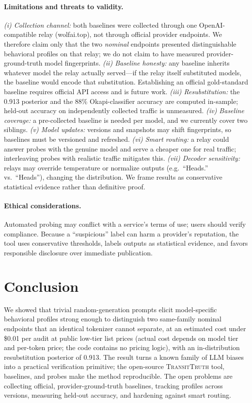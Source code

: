 \documentclass[10pt,twocolumn,letterpaper]{article}
\begin{document}
\paragraph{Limitations and threats to validity.}
\emph{(i) Collection channel:} both baselines were collected through one OpenAI-compatible relay (wolfai.top), not through official provider endpoints. We therefore claim only that the two \emph{nominal} endpoints presented distinguishable behavioral profiles on that relay; we do not claim to have measured provider-ground-truth model fingerprints. \emph{(ii) Baseline honesty:} any baseline inherits whatever model the relay actually served---if the relay itself substituted models, the baseline would encode that substitution. Establishing an official gold-standard baseline requires official API access and is future work. \emph{(iii) Resubstitution:} the 0.913 posterior and the 88\% Okapi-classifier accuracy are computed in-sample; held-out accuracy on independently collected traffic is unmeasured. \emph{(iv) Baseline coverage:} a pre-collected baseline is needed per model, and we currently cover two siblings. \emph{(v) Model updates:} versions and snapshots may shift fingerprints, so baselines must be versioned and refreshed. \emph{(vi) Smart routing:} a relay could answer probes with the genuine model and serve a cheaper one for real traffic; interleaving probes with realistic traffic mitigates this. \emph{(vii) Decoder sensitivity:} relays may override temperature or normalize outputs (e.g.\ ``Heads.'' vs.\ ``Heads''), changing the distribution. We frame results as conservative statistical evidence rather than definitive proof.

\paragraph{Ethical considerations.}
Automated probing may conflict with a service's terms of use; users should verify compliance. Because a ``suspicious'' label can harm a provider's reputation, the tool uses conservative thresholds, labels outputs as statistical evidence, and favors responsible disclosure over immediate publication.

\section{Conclusion}
\label{sec:conclusion}
We showed that trivial random-generation prompts elicit model-specific behavioral profiles strong enough to distinguish two same-family nominal endpoints that an identical tokenizer cannot separate, at an estimated cost under \$0.01 per audit at public low-tier list prices (actual cost depends on model tier and per-token price; the code contains no pricing logic), with an in-distribution resubstitution posterior of 0.913. The result turns a known family of LLM biases into a practical verification primitive; the open-source \textsc{TransitTruth} tool, baselines, and probes make the method reproducible. The open problems are collecting official, provider-ground-truth baselines, tracking profiles across versions, measuring held-out accuracy, and hardening against smart routing.
\end{document}
